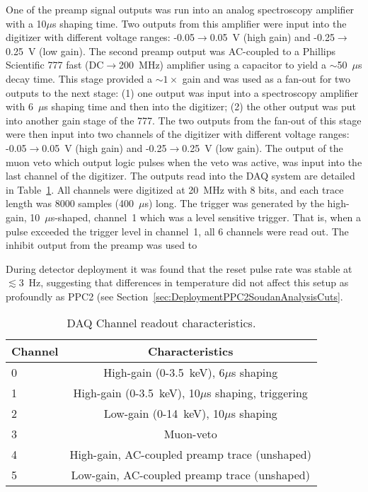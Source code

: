 One of the preamp signal outputs was run into an analog spectroscopy amplifier with a 10$\mu$s shaping time.  Two outputs from this amplifier were input into the digitizer with different voltage ranges: -0.05$\to$0.05~V (high gain) and -0.25$\to$0.25~V (low gain).  The second preamp output was AC-coupled to a Phillips Scientific 777 fast (DC$\to$200~MHz) amplifier using a capacitor to yield a $\sim$50~$\mu$s decay time.  This stage provided a $\sim1\times$ gain and was used as a fan-out for two outputs to the next stage: (1) one output was input into a spectroscopy amplifier with 6~$\mu$s shaping time and then into the digitizer; (2) the other output was put into another gain stage of the 777.  The two outputs from the fan-out of this stage were then input into two channels of the digitizer with different voltage ranges: -0.05$\to$0.05~V (high gain) and -0.25$\to$0.25~V (low gain).  The output of the muon veto which output logic pulses when the veto was active, was input into the last channel of the digitizer.  The outputs read into the DAQ system are detailed in Table~\ref{tab:SoudanDAQTable}.  All channels were digitized at 20~MHz with 8 bits, and each trace length was 8000 samples (400~$\mu$s) long.  The trigger was generated by the high-gain, 10~$\mu$s-shaped, channel~1 which was a level sensitive trigger.  That is, when a pulse exceeded the trigger level in channel~1, all 6 channels were read out.  The inhibit output from the preamp was used to 

During detector deployment it was found that the reset pulse rate was stable at $\lesssim$3~Hz, suggesting that differences in temperature did not affect this setup as profoundly as PPC2 (see Section~\ref{sec:DeploymentPPC2SoudanAnalysisCuts}.  %

\begin{table}
	\centering
	\begin{tabular}{|l|c|}
		\hline
		Channel & Characteristics \\
		\hline
		\hline
		0 & High-gain (0-3.5~keV), 6$\mu$s shaping \\
		\hline
		1 & High-gain (0-3.5~keV), 10$\mu$s shaping, triggering \\
		\hline
		2 & Low-gain (0-14~keV), 10$\mu$s shaping \\
		\hline
		3 & Muon-veto \\
		\hline
		4 & High-gain, AC-coupled preamp trace (unshaped) \\
		\hline
		5 & Low-gain, AC-coupled preamp trace (unshaped) \\
		\hline
	\end{tabular}
	\caption{DAQ Channel readout characteristics. }
	\label{tab:SoudanDAQTable}
\end{table}
	
